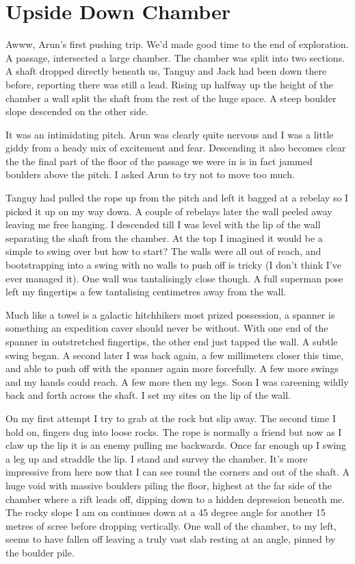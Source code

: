 \section{Upside Down Chamber}

Awww, Arun's first pushing trip. We'd made good time to the end of exploration. A passage,  intersected a large chamber. The chamber was split into two sections. A shaft dropped directly beneath us, Tanguy and Jack had been down there before, reporting there was still a lead. Rising up halfway up the height of the chamber a wall split the shaft from the rest of the huge space. A steep boulder slope descended on the other side.

It was an intimidating pitch. Arun was clearly quite nervous and I was a little giddy from a heady mix of excitement and fear. Descending it also becomes clear the the final part of the floor of the passage we were in is in fact jammed boulders above the pitch. I asked Arun to try not to move too much.

Tanguy had pulled the rope up from the pitch and left it bagged at a rebelay so I picked it up on my way down. A couple of rebelays later the wall peeled away leaving me free hanging. I descended till I was level with the lip of the wall separating the shaft from the chamber. At the top I imagined it would be a simple to swing over but how to start? The walls were all out of reach, and bootstrapping into a swing with no walls to push off is tricky (I don't think I've ever managed it). One wall was tantalisingly close though. A full superman pose left my fingertips a few tantalising centimetres away from the wall.

Much like a towel is a galactic hitchhikers most prized possession, a spanner is something an expedition caver should never be without. With one end of the spanner in outstretched fingertips, the other end just tapped the wall. A subtle swing began. A second later I was back again, a few millimeters closer this time, and able to push off with the spanner again more forcefully. A few more swings and my hands could reach. A few more then my legs. Soon I was careening wildly back and forth across the shaft. I set my sites on the lip of the wall. 

On my first attempt I try to grab at the rock but slip away. The second time I hold on, fingers dug into loose rocks. The rope is normally a friend but now as I claw up the lip it is an enemy pulling me backwards. Once far enough up I swing a leg up and straddle the lip. I stand and survey the chamber. It's more impressive from here now that I can see round the corners and out of the shaft. A huge void with massive boulders piling the floor, highest at the far side of the chamber where a rift leads off, dipping down to a hidden depression beneath me. The rocky slope I am on continues down at a 45 degree angle for another 15 metres of scree before dropping vertically. One wall of the chamber, to my left, seems to have fallen off leaving a truly vast slab resting at an angle, pinned by the boulder pile. 

